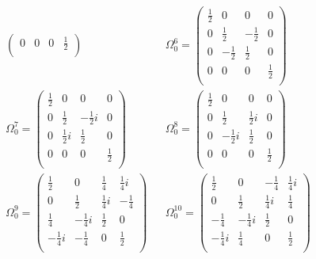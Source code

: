 \begin{align*}
\begin{pmatrix}
    0  &  0  &  0  &  \frac{1}{2}  \\
    \end{pmatrix}
    &&
    \Omega_{0}^{6} = 
    \begin{pmatrix}
    \frac{1}{2}  &  0  &  0  &  0  \\
    0  &  \frac{1}{2}  &  -\frac{1}{2}  &  0  \\
    0  &  -\frac{1}{2}  &  \frac{1}{2}  &  0  \\
    0  &  0  &  0  &  \frac{1}{2}  \\
    \end{pmatrix}
    \\
    \Omega_{0}^{7} = 
    \begin{pmatrix}
    \frac{1}{2}  &  0  &  0  &  0  \\
    0  &  \frac{1}{2}  &  -\frac{1}{2}i  &  0  \\
    0  &  \frac{1}{2}i  &  \frac{1}{2}  &  0  \\
    0  &  0  &  0  &  \frac{1}{2}  \\
    \end{pmatrix}
    &&
    \Omega_{0}^{8} = 
    \begin{pmatrix}
    \frac{1}{2}  &  0  &  0  &  0  \\
    0  &  \frac{1}{2}  &  \frac{1}{2}i  &  0  \\
    0  &  -\frac{1}{2}i  &  \frac{1}{2}  &  0  \\
    0  &  0  &  0  &  \frac{1}{2}  \\
    \end{pmatrix}
    \\
    \Omega_{0}^{9} = 
    \begin{pmatrix}
    \frac{1}{2}  &  0  &  \frac{1}{4}  &  \frac{1}{4}i  \\
    0  &  \frac{1}{2}  &  \frac{1}{4}i  &  -\frac{1}{4}  \\
    \frac{1}{4}  &  -\frac{1}{4}i  &  \frac{1}{2}  &  0  \\
    -\frac{1}{4}i  &  -\frac{1}{4}  &  0  &  \frac{1}{2}  \\
    \end{pmatrix}
    &&
    \Omega_{0}^{10} = 
    \begin{pmatrix}
    \frac{1}{2}  &  0  &  -\frac{1}{4}  &  \frac{1}{4}i  \\
    0  &  \frac{1}{2}  &  \frac{1}{4}i  &  \frac{1}{4}  \\
    -\frac{1}{4}  &  -\frac{1}{4}i  &  \frac{1}{2}  &  0  \\
    -\frac{1}{4}i  &  \frac{1}{4}  &  0  &  \frac{1}{2}  \\

\end{pmatrix}
\end{align*}
